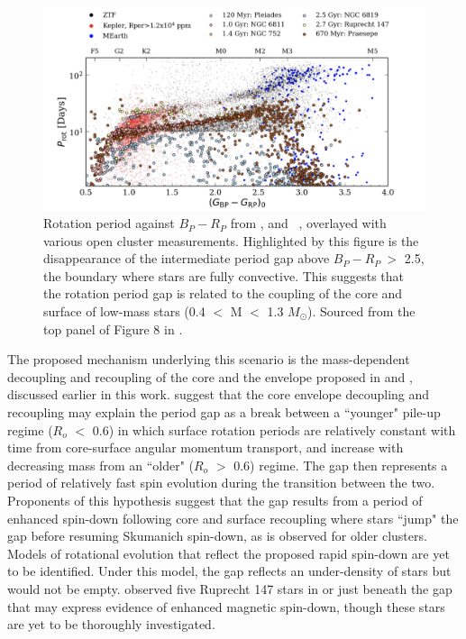 \begin{figure}[h]
    \includegraphics[width=\textwidth]{Figures/intro_figures/ztf_comp.png}
    \caption[Rotation period distribution including fully convective stars.]{Rotation period against \gaia{} $B_P - R_P$ from \kepler{} \ZTF{}, and \MEarth\ \citep{irwin_angular_2011, berta_transit_2012, newton_new_2018}, overlayed with various open cluster measurements. Highlighted by this figure is the disappearance of the intermediate period gap above $B_P-R_P \ >$ 2.5, the boundary where stars are fully convective. This suggests that the rotation period gap is related to the coupling of the core and surface of low-mass stars (0.4 $<$ M $<$ 1.3 $M_{\odot}$). Sourced from the top panel of Figure 8 in \citet{lu_bridging_2022}.}
    \label{fig:ztf_comp}
\end{figure}

The proposed mechanism underlying this scenario is the mass-dependent decoupling and recoupling of the core and the envelope proposed in \citet{lanzafame_rotational_2015} and \citet{spada_competing_2020}, discussed earlier in this work.
\citet{angus_exploring_2020} suggest that the core envelope decoupling and recoupling may explain the period gap as a break between a ``younger" pile-up regime ($R_o$ $<$ 0.6) in which surface rotation periods are relatively constant with time from core-surface angular momentum transport, and increase with decreasing mass from an ``older" ($R_o$ $>$ 0.6) regime.
The gap then represents a period of relatively fast spin evolution during the transition between the two.
Proponents of this hypothesis suggest that the gap results from a period of enhanced spin-down following core and surface recoupling where stars ``jump" the gap before resuming Skumanich spin-down, as is observed for older clusters.
Models of rotational evolution  that reflect the proposed rapid spin-down are yet to be identified.
Under this model, the gap reflects an under-density of stars but would not be empty.
\citet{curtis_when_2020} observed five Ruprecht 147 stars in or just beneath the gap that may express evidence of enhanced magnetic spin-down, though these stars are yet to be thoroughly investigated.

